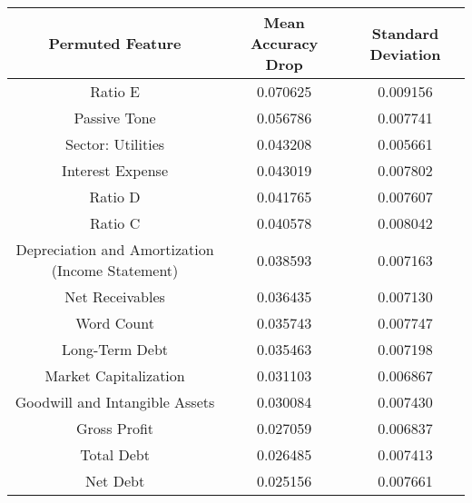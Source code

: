 \tiny
\begin{tabular}{ccc}
\toprule
Permuted Feature & Mean Accuracy Drop & Standard Deviation \\
\midrule
Ratio E & 0.070625 & 0.009156 \\
Passive Tone & 0.056786 & 0.007741 \\
Sector: Utilities & 0.043208 & 0.005661 \\
Interest Expense & 0.043019 & 0.007802 \\
Ratio D & 0.041765 & 0.007607 \\
Ratio C & 0.040578 & 0.008042 \\
Depreciation and Amortization (Income Statement) & 0.038593 & 0.007163 \\
Net Receivables & 0.036435 & 0.007130 \\
Word Count & 0.035743 & 0.007747 \\
Long-Term Debt & 0.035463 & 0.007198 \\
Market Capitalization & 0.031103 & 0.006867 \\
Goodwill and Intangible Assets & 0.030084 & 0.007430 \\
Gross Profit & 0.027059 & 0.006837 \\
Total Debt & 0.026485 & 0.007413 \\
Net Debt & 0.025156 & 0.007661 \\
\bottomrule
\end{tabular}

\normalsize